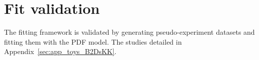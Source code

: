 



\section{Fit validation}
\label{sec:B2DsKK_fitvalidation}

The fitting framework is validated by generating pseudo-experiment datasets and fitting them with the PDF model. The studies detailed in Appendix~\ref{sec:app_toys_B2DsKK}.




